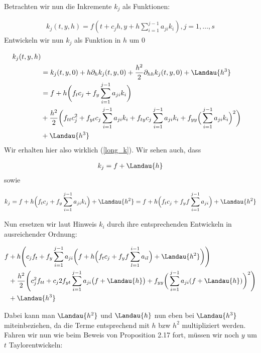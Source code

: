 \begin{solution}

Betrachten wir nun die Inkremente $k_j$ als Funktionen:

\begin{align*}
  k_j(t,y,h)=f(t+c_jh,y+h \sum_{i=1}^{j-1}a_{ji}k_i), \text{}j=1,...,s
\end{align*}
Entwickeln wir nun $k_j$ als Funktion in $h$ um 0

\begin{align*}
  k_j(t,y,h) \\
  &= k_j(t,y,0)
  + h\partial_h k_j(t,y,0)
  + \frac{h^2}{2} \partial_{hh} k_j(t,y,0)
  + \Landau{h^3} \\
  &= f + h\bigg(f_t c_j+ f_y \sum_{i=1}^{j-1} a_{ji} k_i \bigg) \\
  &+ \frac{h^2}{2} \bigg( f_{tt} c_j^2 +f_{yt} c_j \sum_{i=1}^{j-1} a_{ji} k_i
  + f_{ty} c_j \sum_{i=1}^{j-1} a_{ji} k_{i} + f_{yy} \Big(
  \sum_{i=1}^{j-1} a_{ji} k_i\Big)^2 \bigg)\\
  &+ \Landau{h^3}
\end{align*}
Wir erhalten hier also wirklich (\ref{long_k}). Wir sehen auch, dass

\begin{align*}
  k_j = f + \Landau{h}
\end{align*}
sowie

\begin{align*}
  k_j = f + h\Big( f_t c_j + f_y\sum_{i=1}^{j-1} a_{ji} k_i\Big) + \Landau{h^2}
  = f + h\Big(f_t c_j + f_y f \sum_{i=1}^{j-1} a_{ji}\Big) + \Landau{h^2}
\end{align*}

Nun ersetzen wir laut Hinweis $k_i$ durch ihre entsprechenden Entwickeln in ausreichender Ordnung:

\begin{align*}
  f &+ h\Bigg(c_j f_t + f_y \sum_{i=1}^{j-1} a_{ji}
  \bigg( f + h \Big( f_t c_j + f_y f \sum_{l=1}^{i-1}a_{il}
  \Big) + \Landau{h^2}
  \bigg) \Bigg) \\
  &+ \frac{h^2}{2} \Bigg( c_j^2 f_{tt} +c_j 2f_{yt} \sum_{i=1}^{j-1} a_{ji}
  \big( f + \Landau{h} \big)
  + f_{yy} \bigg( \sum_{i=1}^{j-1} a_{ji} (f + \Landau{h})
  \bigg)^2 \Bigg)\\
  &+ \Landau{h^3}
\end{align*}

Dabei kann man $\Landau{h^2}$ und $\Landau{h}$ nun eben bei $\Landau{h^3}$ miteinbeziehen,
da die Terme entsprechend mit $h$ bzw $h^2$ multipliziert werden.
Fahren wir nun wie beim Beweis von Proposition 2.17 fort, müssen wir noch $y$ um
$t$ Taylorentwickeln:


\end{solution}
